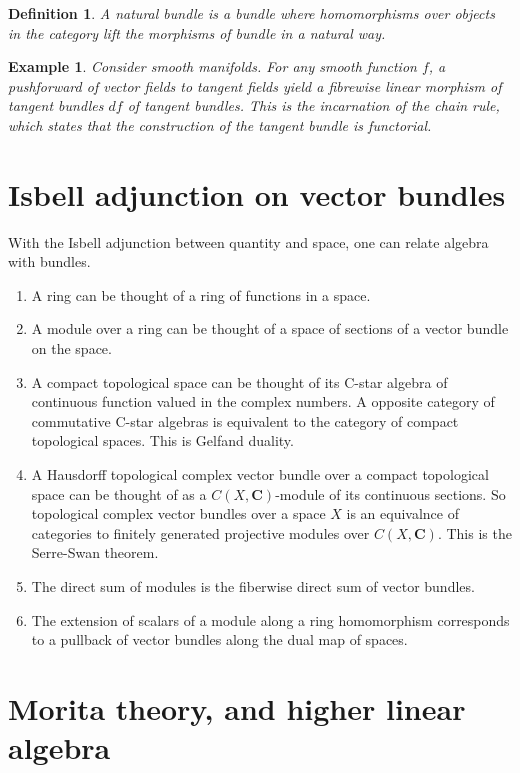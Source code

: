 \documentclass{tufte-book}
\newtheorem{definition}[theorem]{Definition}
\newtheorem{example}[theorem]{Example}
\begin{document}
\begin{definition}
	A natural bundle is a bundle where homomorphisms over objects in the category lift the morphisms of bundle in a natural way.
\end{definition}

\begin{example}
	Consider smooth manifolds. For any smooth function $f$, a pushforward of vector fields to tangent fields yield a fibrewise linear morphism of tangent bundles $df$ of tangent bundles. This is the incarnation of the chain rule, which states that the construction of the tangent bundle is functorial.
\end{example}

\section{Isbell adjunction on vector bundles}

With the Isbell adjunction between quantity and space, one can relate algebra with bundles.

\begin{enumerate}
	\item A ring can be thought of a ring of functions in a space.
	\item A module over a ring can be thought of a space of sections of a vector bundle on the space.
	\item A compact topological space can be thought of its C-star algebra of continuous function valued in the complex numbers. A opposite category of commutative C-star algebras is equivalent to the category of compact topological spaces. This is Gelfand duality.
	\item A Hausdorff topological complex vector bundle over a compact topological space can be thought of as a $C(X, \mathbf{C})$-module of its continuous sections. So topological complex vector bundles over a space $X$ is an equivalnce of categories to finitely generated projective modules over $C(X, \mathbf{C})$. This is the Serre-Swan theorem.
	\item The direct sum of modules is the fiberwise direct sum of vector bundles.
	\item The extension of scalars of a module along a ring homomorphism corresponds to a pullback of vector bundles along the dual map of spaces.
\end{enumerate}

\section{Morita theory, and higher linear algebra}
\end{document}
